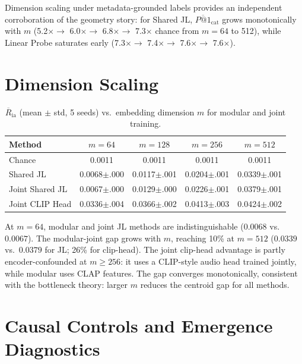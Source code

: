 \documentclass{article}
\newcommand{\avgR}{\overline{R}}
\begin{document}
Dimension scaling under metadata-grounded labels provides an independent corroboration of the geometry story:
for Shared JL, $\overline{P\text{@}1}_\mathrm{cat}$ grows monotonically with $m$ (5.2$\times \rightarrow$ 6.0$\times \rightarrow$ 6.8$\times \rightarrow$ 7.3$\times$ chance from $m=64$ to 512), while Linear Probe saturates early (7.3$\times \rightarrow$ 7.4$\times \rightarrow$ 7.6$\times \rightarrow$ 7.6$\times$).


\section{Dimension Scaling}
\label{app:dimscale}

\begin{table}[ht]
  \caption{$\avgR_\mathrm{ia}$ (mean $\pm$ std, 5 seeds) vs.\ embedding dimension $m$ for modular and joint training.}
  \label{tab:dimscale}
  \centering
  \footnotesize
  \begin{tabular}{lcccc}
    \toprule
    Method & $m=64$ & $m=128$ & $m=256$ & $m=512$ \\
    \midrule
    Chance                & 0.0011 & 0.0011 & 0.0011 & 0.0011 \\
    Shared JL            & 0.0068$\pm$.000 & 0.0117$\pm$.001 & 0.0204$\pm$.001 & 0.0339$\pm$.001 \\
    Joint Shared JL      & 0.0067$\pm$.000 & 0.0129$\pm$.000 & 0.0226$\pm$.001 & 0.0379$\pm$.001 \\
    Joint CLIP Head      & 0.0336$\pm$.004 & 0.0366$\pm$.002 & 0.0413$\pm$.003 & 0.0424$\pm$.002 \\
    \bottomrule
  \end{tabular}
\end{table}

At $m=64$, modular and joint JL methods are indistinguishable ($0.0068$ vs.\ $0.0067$).
The modular-joint gap grows with $m$, reaching 10\% at $m=512$ ($0.0339$ vs.\ $0.0379$ for JL; 26\% for clip-head).
The joint clip-head advantage is partly encoder-confounded at $m \geq 256$: it uses a CLIP-style audio head trained jointly, while modular uses CLAP features.
The gap converges monotonically, consistent with the bottleneck theory: larger $m$ reduces the centroid gap for all methods.

\section{Causal Controls and Emergence Diagnostics}
\label{app:emergence_controls}
\end{document}
